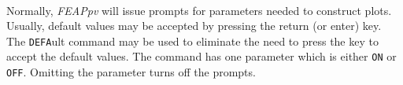  \\{\smallskip}
\headb

Normally, {\sl FEAPpv} will issue prompts for parameters needed to
construct plots.  Usually, default values may be accepted by pressing
the return (or enter) key.  The {\tt DEFA}ult command may be used to
eliminate the need to press the key to accept the default values.  The
command has one parameter which is either {\tt ON} or {\tt OFF}.  Omitting
the parameter turns off the prompts.
\vfill
\eject
